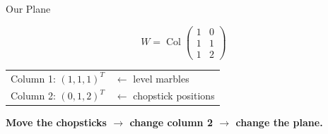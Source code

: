 \documentclass[10pt]{beamer}
\theoremstyle{definition}
\newcommand{\x}[1]{\alert{\textbf{#1}}}
\begin{document}
\begin{frame}{Our Plane}

$$W = \operatorname{Col}\begin{pmatrix} 1 & 0 \\ 1 & 1 \\ 1 & 2 \end{pmatrix}$$

\vspace{0.3em}

\begin{center}
\renewcommand{\arraystretch}{1.2}
\begin{tabular}{cl}
Column 1: $(1, 1, 1)^T$ & $\leftarrow$ level marbles \\
Column 2: $(0, 1, 2)^T$ & $\leftarrow$ chopstick positions
\end{tabular}
\end{center}

\vspace{0.5em}

\x{Move the chopsticks $\to$ change column 2 $\to$ change the plane.}

\end{frame}
\end{document}

